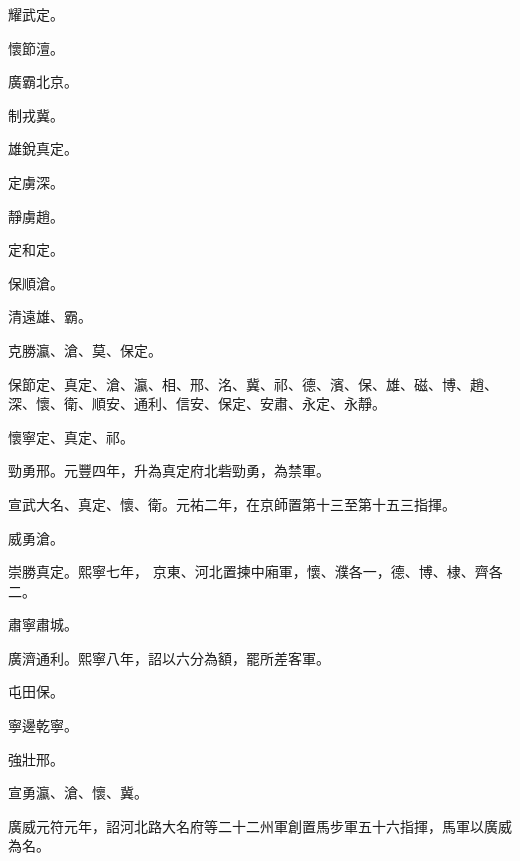 \begin{pinyinscope}
 耀武定。



 懷節澶。



 廣霸北京。



 制戎冀。



 雄銳真定。



 定虜深。



 靜虜趙。



 定和定。



 保順滄。



 清遠雄、霸。



 克勝瀛、滄、莫、保定。



 保節定、真定、滄、瀛、相、邢、洺、冀、祁、德、濱、保、雄、磁、博、趙、深、懷、衛、順安、通利、信安、保定、安肅、永定、永靜。



 懷寧定、真定、祁。



 勁勇邢。元豐四年，升為真定府北砦勁勇，為禁軍。



 宣武大名、真定、懷、衛。元祐二年，在京師置第十三至第十五三指揮。



 威勇滄。



 崇勝真定。熙寧七年，
 京東、河北置揀中廂軍，懷、濮各一，德、博、棣、齊各二。



 肅寧肅城。



 廣濟通利。熙寧八年，詔以六分為額，罷所差客軍。



 屯田保。



 寧邊乾寧。



 強壯邢。



 宣勇瀛、滄、懷、冀。



 廣威元符元年，詔河北路大名府等二十二州軍創置馬步軍五十六指揮，馬軍以廣威為名。




\end{pinyinscope}
